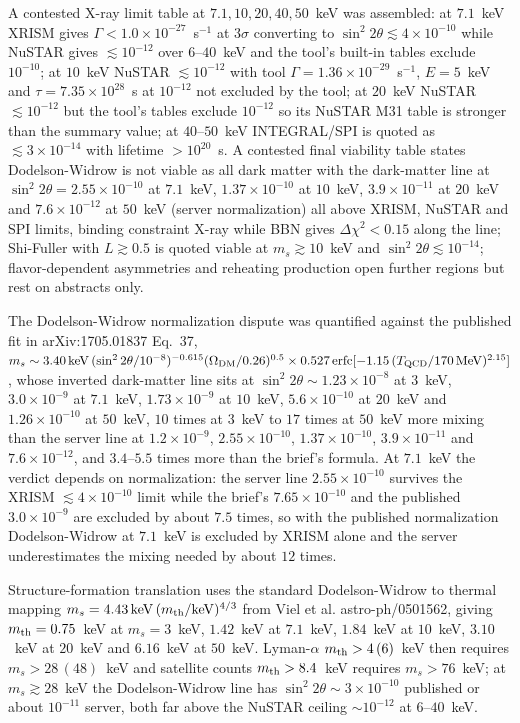 \documentclass[11pt,a4paper]{article}
\begin{document}
A contested X-ray limit table at $7.1,10,20,40,50$~keV was assembled: at $7.1$~keV XRISM gives $\Gamma<1.0\times10^{-27}$~s$^{-1}$ at $3\sigma$ converting to $\sin^{2}2\theta\lesssim4\times10^{-10}$ while NuSTAR gives $\lesssim10^{-12}$ over $6$--$40$~keV and the tool's built-in tables exclude $10^{-10}$; at $10$~keV NuSTAR $\lesssim10^{-12}$ with tool $\Gamma=1.36\times10^{-29}$~s$^{-1}$, $E=5$~keV and $\tau=7.35\times10^{28}$~s at $10^{-12}$ not excluded by the tool; at $20$~keV NuSTAR $\lesssim10^{-12}$ but the tool's tables exclude $10^{-12}$ so its NuSTAR M31 table is stronger than the summary value; at $40$--$50$~keV INTEGRAL/SPI is quoted as $\lesssim3\times10^{-14}$ with lifetime $>10^{20}$~s. A contested final viability table states Dodelson-Widrow is not viable as all dark matter with the dark-matter line at $\sin^{2}2\theta=2.55\times10^{-10}$ at $7.1$~keV, $1.37\times10^{-10}$ at $10$~keV, $3.9\times10^{-11}$ at $20$~keV and $7.6\times10^{-12}$ at $50$~keV (server normalization) all above XRISM, NuSTAR and SPI limits, binding constraint X-ray while BBN gives $\Delta\chi^{2}<0.15$ along the line; Shi-Fuller with $L\gtrsim0.5$ is quoted viable at $m_{s}\gtrsim10$~keV and $\sin^{2}2\theta\lesssim10^{-14}$; flavor-dependent asymmetries and reheating production open further regions but rest on abstracts only.

The Dodelson-Widrow normalization dispute was quantified against the published fit in arXiv:1705.01837 Eq.~37, $m_{s}\sim3.40\,{\rm keV}\,(\sin^{2}2\theta/10^{-8})^{-0.615}(\Omega_{\rm DM}/0.26)^{0.5}\times0.527\,{\rm erfc}[-1.15\,(T_{\rm QCD}/170\,{\rm MeV})^{2.15}]$, whose inverted dark-matter line sits at $\sin^{2}2\theta\sim1.23\times10^{-8}$ at $3$~keV, $3.0\times10^{-9}$ at $7.1$~keV, $1.73\times10^{-9}$ at $10$~keV, $5.6\times10^{-10}$ at $20$~keV and $1.26\times10^{-10}$ at $50$~keV, $10$ times at $3$~keV to $17$ times at $50$~keV more mixing than the server line at $1.2\times10^{-9}$, $2.55\times10^{-10}$, $1.37\times10^{-10}$, $3.9\times10^{-11}$ and $7.6\times10^{-12}$, and $3.4$--$5.5$ times more than the brief's formula. At $7.1$~keV the verdict depends on normalization: the server line $2.55\times10^{-10}$ survives the XRISM $\lesssim4\times10^{-10}$ limit while the brief's $7.65\times10^{-10}$ and the published $3.0\times10^{-9}$ are excluded by about $7.5$ times, so with the published normalization Dodelson-Widrow at $7.1$~keV is excluded by XRISM alone and the server underestimates the mixing needed by about $12$ times.

Structure-formation translation uses the standard Dodelson-Widrow to thermal mapping $m_{s}=4.43\,{\rm keV}\,(m_{\rm th}/{\rm keV})^{4/3}$ from Viel et al. astro-ph/0501562, giving $m_{\rm th}=0.75$~keV at $m_{s}=3$~keV, $1.42$~keV at $7.1$~keV, $1.84$~keV at $10$~keV, $3.10$~keV at $20$~keV and $6.16$~keV at $50$~keV. Lyman-$\alpha$ $m_{\rm th}>4\,(6)$~keV then requires $m_{s}>28\,(48)$~keV and satellite counts $m_{\rm th}>8.4$~keV requires $m_{s}>76$~keV; at $m_{s}\gtrsim28$~keV the Dodelson-Widrow line has $\sin^{2}2\theta\sim3\times10^{-10}$ published or about $10^{-11}$ server, both far above the NuSTAR ceiling $\sim10^{-12}$ at $6$--$40$~keV.
\end{document}
